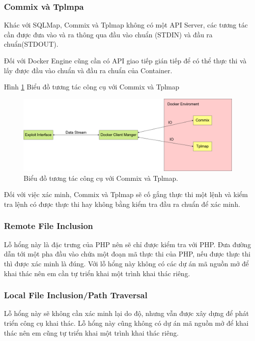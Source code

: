 \documentclass[./../main.tex]{subfiles}
\begin{document}
\subsubsection{Commix và Tplmpa}
Khác với SQLMap, Commix và Tplmap không có một API Server, các tương tác cần được đưa vào và ra thông qua đầu vào chuẩn (STDIN) và đầu ra chuẩn(STDOUT).

Đối với Docker Engine cũng cần có API giao tiếp gián tiếp để có thể thực thi và lấy được đầu vào chuẩn và đầu ra chuẩn của Container.


Hình \ref{fig:commix_tplmap} Biểu đồ tương tác công cụ với Commix và Tplmap

\begin{figure}[h!]
	\includegraphics[width=\linewidth]{./images/DockerIO.drawio.png}
	\caption{Biểu đồ tương tác công cụ với Commix và Tplmap.}
	\label{fig:commix_tplmap}
\end{figure}

Đối với việc xác minh, Commix và Tplmap sẽ cố gắng thực thi một lệnh và kiểm tra lệnh có được thực thi hay không bằng kiểm tra đầu ra chuẩn để xác minh.

\subsubsection{Remote File Inclusion}
Lỗ hổng này là đặc trưng của PHP nên sẽ chỉ được kiểm tra với PHP. Đưa đường dẫn tới một pha đầu vào chứa một đoạn mã thực thi của PHP, nếu được thực thi thì được xác minh là đúng. Với lỗ hổng này không có các dự án mã nguồn mở để khai thác nên em cần tự triển khai một trình khai thác riêng.
\subsubsection{Local File Inclusion/Path Traversal}
Lỗ hổng này sẽ không cần xác minh lại do độ, nhưng vẫn được xây dựng để phát triển công cụ khai thác. Lỗ hổng này cũng không có dự án mã nguồn mở để khai thác nên em cũng tự triển khai một trình khai thác riêng.
\end{document}
